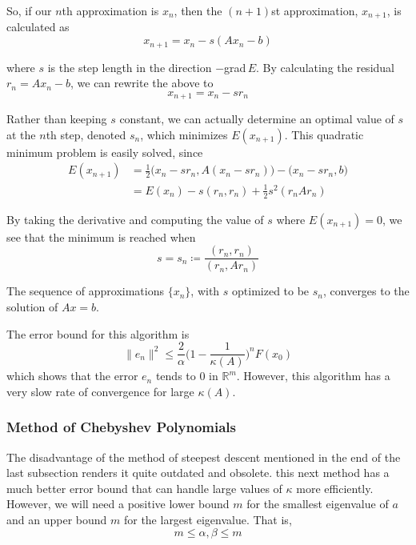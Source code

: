   So, if our $n$th approximation is $x_n$, then the $(n+1)$st approximation, $x_{n+1}$, is calculated as
  \begin{equation}
    x_{n+1} = x_n - s (Ax_n - b)
  \end{equation}

  where $s$ is the step length in the direction $-$grad$\,E$. By calculating the residual $r_n = A x_n - b$, we can rewrite the above to
  \begin{equation}
    x_{n+1} = x_n - s r_n
  \end{equation}

  Rather than keeping $s$ constant, we can actually determine an optimal value of $s$ at the $n$th step, denoted $s_n$, which minimizes $E(x_{n+1})$. This quadratic minimum problem is easily solved, since
  \begin{align}
    E(x_{n+1}) & = \frac{1}{2} \big(x_n - s r_n, A(x_n - s r_n) \big) - \big( x_n - s r_n, b\big) \\
    & = E(x_n) - s (r_n, r_n) + \frac{1}{2} s^2 (r_n A r_n)
  \end{align}

  By taking the derivative and computing the value of $s$ where $E (x_{n+1}) = 0$, we see that the minimum is reached when 
  \begin{equation}
    s = s_n \coloneqq \frac{(r_n, r_n)}{(r_n, A r_n)}
  \end{equation}

  \begin{theorem}
    \label{thm:convergence-of-steepest-descent}
    The sequence of approximations $\{x_n\}$, with $s$ optimized to be $s_n$, converges to the solution of $A x = b$. 
  \end{theorem}

  The error bound for this algorithm is 
  \begin{equation}
    \|e_n\|^2 \leq \frac{2}{\alpha} \bigg( 1-\frac{1}{\kappa(A)} \bigg)^n F(x_0)
  \end{equation}
  which shows that the error $e_n$ tends to $0$ in $\mathbb{R}^m$. However, this algorithm has a very slow rate of convergence for large $\kappa(A)$. 

\subsubsection{Method of Chebyshev Polynomials}

  The disadvantage of the method of steepest descent mentioned in the end of the last subsection renders it quite outdated and obsolete. this next method has a much better error bound that can handle large values of $\kappa$ more efficiently. However, we will need a positive lower bound $m$ for the smallest eigenvalue of $a$ and an upper bound $m$ for the largest eigenvalue. That is, 
  \begin{equation}
    m \leq \alpha, \beta \leq m
  \end{equation}

